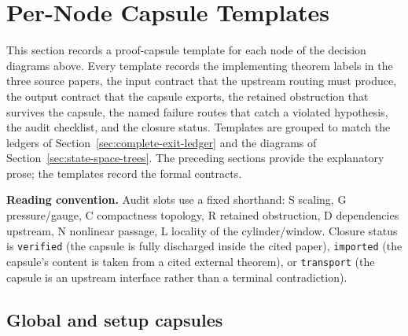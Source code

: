 \documentclass[11pt]{amsart}
\begin{document}
\section{Per-Node Capsule Templates}
\label{sec:capsule-templates}

This section records a proof-capsule template for each node of the decision diagrams above.
Every template records the implementing theorem labels in the three source
papers, the input contract that the upstream routing must produce, the output
contract that the capsule exports, the retained obstruction that survives the
capsule, the named failure routes that catch a violated hypothesis, the audit
checklist, and the closure status.  Templates are grouped to match the
ledgers of Section~\ref{sec:complete-exit-ledger} and the diagrams of
Section~\ref{sec:state-space-trees}.  The preceding sections provide the explanatory prose; the templates record the formal contracts.

\medskip
\noindent\textbf{Reading convention.}  Audit slots use a fixed shorthand:
\textsc{S} scaling, \textsc{G} pressure/gauge, \textsc{C} compactness
topology, \textsc{R} retained obstruction, \textsc{D} dependencies upstream,
\textsc{N} nonlinear passage, \textsc{L} locality of the cylinder/window.
Closure status is \texttt{verified} (the capsule is fully discharged inside
the cited paper), \texttt{imported} (the capsule's content is taken from a
cited external theorem), or \texttt{transport} (the capsule is an upstream
interface rather than a terminal contradiction).

\newenvironment{proofcapsule}[1]{%
  \par\medskip
  \noindent\textbf{#1}\par\smallskip
}{%
  \par\medskip
}

\subsection{Global and setup capsules}
\end{document}

